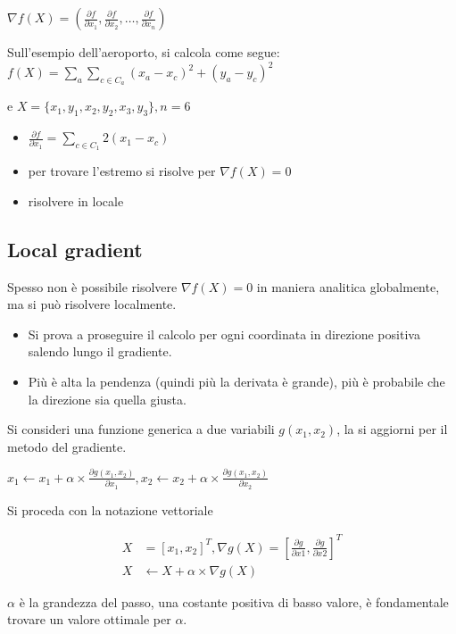 \documentclass[12pt, a4paper]{article}
\begin{document}
$
\nabla f(X) = 
\left(
  \frac{\partial f}{\partial x_1},
  \frac{\partial f}{\partial x_2},
  \dots,
  \frac{\partial f}{\partial x_n}
\right)
$

Sull'esempio dell'aeroporto, si calcola come segue:
$
f(X) = \sum_a{\sum_{c\in C_a}(x_a-x_c)^2+(y_a-y_c)^2}
$

e $X = \{x_1,y_1,x_2,y_2,x_3,y_3\}, n=6$

\begin{itemize}
  \item $\frac{\partial f}{\partial x_1}=\sum_{c\in C_1}2(x_1-x_c)$
  \item per trovare l'estremo si risolve per $\nabla f(X) = 0$
  \item risolvere in locale
\end{itemize}

\subsection{Local gradient}

Spesso non è possibile risolvere $\nabla f(X) = 0$ in maniera analitica globalmente, ma si può risolvere localmente.

\begin{itemize}
  \item Si prova a proseguire il calcolo per ogni coordinata in direzione positiva salendo lungo il gradiente.
  \item Più è alta la pendenza (quindi più la derivata è grande), più è probabile che la direzione sia quella giusta.
\end{itemize}

Si consideri una funzione generica a due variabili $g(x_1,x_2)$, la si aggiorni per il metodo del gradiente.

$
x_1\leftarrow x_1 + \alpha \times \frac{\partial g(x_1,x_2)}{\partial x_1}, x_2\leftarrow x_2 + \alpha \times \frac{\partial g(x_1,x_2)}{\partial x_2}
$

Si proceda con la notazione vettoriale

\begin{align*}
  X & = [x_1, x_2]^T, \nabla g(X) =[\frac{\partial g}{\partial x1}, \frac{\partial g}{\partial x2}]^T \\
  X &\leftarrow X + \alpha \times \nabla g(X)
\end{align*}

$\alpha$ è la grandezza del passo, una costante positiva di basso valore, è fondamentale trovare un valore ottimale per $\alpha$.
\end{document}
